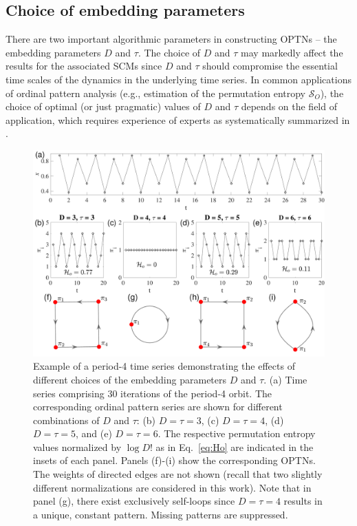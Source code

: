 \documentclass[12pt,aip,cha,reprint,nofootinbib]{revtex4-1}
\begin{document}
\subsection{Choice of embedding parameters} \label{sec:embeddings}
There are two important algorithmic parameters in constructing OPTNs -- the embedding parameters $D$ and $\tau$. The choice of $D$ and $\tau$ may markedly affect the results for the associated SCMs since $D$ and $\tau$ should compromise the essential time scales of the dynamics in the underlying time series. In common applications of ordinal pattern analysis (e.g., estimation of the permutation entropy $\mathcal{S}_O$), the choice of optimal (or just pragmatic) values of $D$ and $\tau$ depends on the field of application, which requires experience of experts as systematically summarized in \cite{Riedl2013}.

\begin{figure}
	\centering 
	\includegraphics[width=2\columnwidth]{period4_logisticExample.pdf}
\caption{\small{Example of a period-4 time series demonstrating the effects of different choices of the embedding parameters $D$ and $\tau$. (a) Time series comprising 30 iterations of the period-4 orbit. The corresponding ordinal pattern series are shown for different combinations of $D$ and $\tau$: (b) $D = \tau = 3$, (c) $D = \tau = 4$, (d) $D = \tau = 5$, and (e) $D = \tau = 6$. The respective permutation entropy values normalized by $\log D!$ as in Eq.~\eqref{eq:Ho} are indicated in the insets of each panel. Panels (f)-(i) show the corresponding OPTNs. The weights of directed edges are not shown (recall that two slightly different normalizations are considered in this work). Note that in panel (g), there exist exclusively self-loops since $D = \tau = 4$ results in a unique, constant pattern. Missing patterns are suppressed.}
\label{fig:embed}}
\end{figure}
\end{document}
